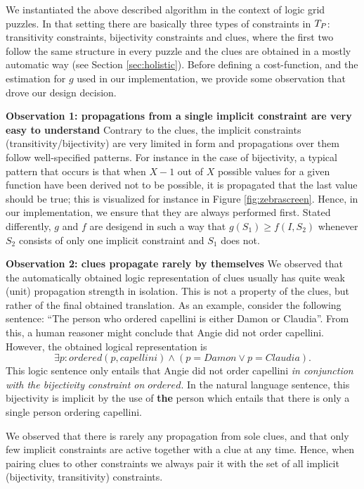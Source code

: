 We instantiated the above described algorithm in the context of logic grid puzzles. 
In that setting there are basically three types of constraints in $T_P$: transitivity constraints, bijectivity constraints and clues, where the first two follow the same structure in every puzzle and the clues are obtained in a mostly automatic way (see Section \ref{sec:holistic}). 
Before defining a cost-function, and the estimation for $g$ used in our implementation, we provide some observation that drove our design decision. 

\textbf{Observation 1: propagations from a single implicit constraint are very easy to understand} Contrary to the clues, the implicit constraints (transitivity/bijectivity) are very limited in form and propagations over them follow well-specified patterns. 
For instance in the case of bijectivity, a typical pattern that occurs is that when $X-1$ out of $X$ possible values for a given function have been derived not to be possible, it is propagated that the last value should be true; this is visualized for instance in Figure \ref{fig:zebrascreen}. 
Hence, in our implementation, we ensure that they are always performed first. Stated differently, $g$ and $f$ are desigend in such a way that $g(S_1)\geq f(I,S_2)$ whenever $S_2$ consists of only one implicit constraint and $S_1$ does not. 

\textbf{Observation 2: clues propagate rarely by themselves}
We observed that the automatically obtained logic representation of clues usually has quite weak (unit) propagation strength in isolation. 
This is not a property of the clues, but rather of the final obtained translation. As an example, consider the following sentence: 
``The person who ordered capellini is either Damon or Claudia''. From this, a human reasoner might conclude that Angie did not order capellini. 
However, the obtained logical representation is 
\[\exists p: ordered(p,capellini)\land (p = Damon\lor p = Claudia).\]
This logic sentence only entails that Angie did not order capellini \emph{in conjunction with the bijectivity constraint on $ordered$}.
In the natural language sentence, this bijectivity is implicit by the use of \textbf{the} person which entails that there is only a single person ordering capellini. 

We observed that there is rarely any propagation from sole clues, and that only few implicit constraints are active together with a clue at any time. Hence, when pairing clues to other constraints we always pair it with the set of all implicit (bijectivity, transitivity) constraints.

